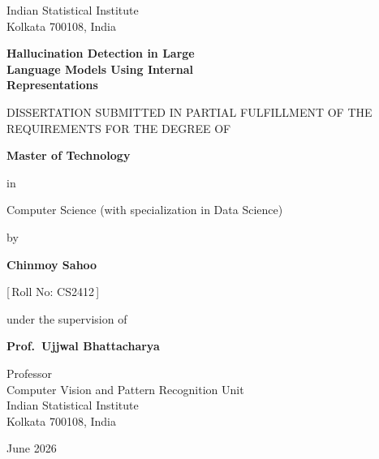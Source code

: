 \documentclass[12pt,a4paper,oneside]{report}
\begin{document}
\begin{titlepage}
\centering
\vspace*{0.4cm}
{\large Indian Statistical Institute}\\[0.2cm]
{\small Kolkata 700108, India}\\[1.6cm]
{\LARGE\bfseries Hallucination Detection in Large\\[0.2cm]
Language Models Using Internal\\[0.2cm] Representations\par}
\vspace{1.4cm}
{\normalsize DISSERTATION SUBMITTED IN PARTIAL FULFILLMENT OF THE\\
REQUIREMENTS FOR THE DEGREE OF\par}
\vspace{0.6cm}
{\large\bfseries Master of Technology\par}
\vspace{0.2cm}
{\normalsize in\par}
\vspace{0.2cm}
{\large Computer Science (with specialization in Data Science)\par}
\vspace{1.0cm}
{\normalsize by\par}
\vspace{0.3cm}
{\large\bfseries Chinmoy Sahoo\par}
{\normalsize [\,Roll No: CS2412\,]\par}
\vspace{1.0cm}
{\normalsize under the supervision of\par}
\vspace{0.3cm}
{\large\bfseries Prof.\ Ujjwal Bhattacharya\par}
{\normalsize Professor\\
Computer Vision and Pattern Recognition Unit\\
Indian Statistical Institute\\
Kolkata 700108, India\par}
\vfill
{\normalsize June 2026\par}
\end{titlepage}
\setcounter{page}{1}
\end{document}
